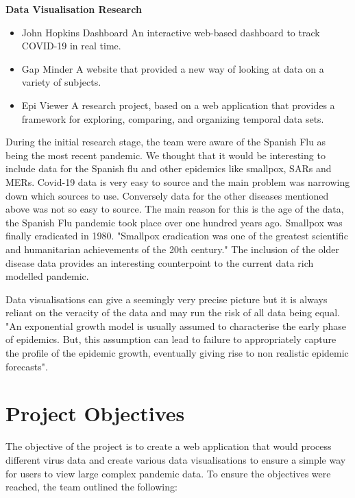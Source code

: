 \vspace{5mm}

\textbf{Data Visualisation Research}
\begin{itemize}
    \item John Hopkins Dashboard
            An interactive web-based dashboard to track COVID-19 in real time.
    \item Gap Minder
            A website that provided a new way of looking at data on a variety of subjects.
    \item Epi Viewer
            A research project, based on a web application that provides a framework for exploring, comparing, and organizing temporal data sets.
    
\end{itemize}

During the initial research stage, the team were aware of the Spanish Flu as being the most recent pandemic. We thought that it would be interesting to include data for the Spanish flu and other epidemics like smallpox, SARs and MERs. Covid-19 data is very easy to source and the main problem was narrowing down which sources to use. Conversely data for the other diseases mentioned above was not so easy to source. The main reason for this is the age of the data, the Spanish Flu pandemic took place over one hundred years ago. Smallpox was finally eradicated in 1980. 
"Smallpox eradication was one of the greatest scientific and humanitarian achievements of the 20th century."\cite{Smallpox} The inclusion of the older disease data provides an interesting counterpoint to the current data rich modelled pandemic.

\vspace{2mm}

Data visualisations can give a seemingly very precise picture but it is always reliant on the veracity of the data and may run the risk of all data being equal. "An exponential growth model is usually assumed to characterise the early phase of epidemics. But, this assumption can lead to failure to appropriately capture the profile of the epidemic growth, eventually giving rise to non realistic epidemic forecasts"\cite{tovissode2020use}.



\section{Project Objectives}
The objective of the project is to create a web application that would process different virus data and create various data visualisations to ensure a simple way for users to view large complex pandemic data. 
To ensure the objectives were reached, the team outlined the following:

